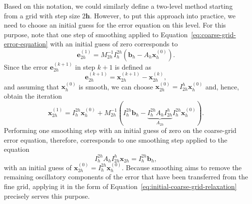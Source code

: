 Based on this notation, we could similarly define a two-level method starting from a grid with step size $2\bm{h}$.
However, to put this approach into practice, we need to choose an initial guess for the error equation on this level.
For this purpose, note that one step of smoothing applied to Equation~\eqref{eq:coarse-grid-error-equation} with an initial guess of zero corresponds to
\begin{equation}
	\bm{e}_{2h}^{(1)} = M_{2h}^{-1} I_{h}^{2h} \left(\bm{b}_h - A_h \bm{x}^{(0)}_h\right).
	\label{eq:initial-coarse-grid-relaxation}
\end{equation}
Since the error $\bm{e}_{2h}^{(k+1)}$ in step $k+1$ is defined as
\begin{equation*}
	\bm{e}_{2h}^{(k+1)} = \bm{x}_{2h}^{(k+1)} - \bm{x}_{2h}^{(k)},
\end{equation*}
and assuming that $\bm{x}_{h}^{(0)}$ is smooth, we can choose $\bm{x}_{2h}^{(0)} = I_{2h}^{h} \bm{x}_{h}^{(0)}$ and, hence, obtain the iteration
\begin{equation}
	\bm{x}_{2h}^{(1)} = I_{h}^{2h} \bm{x}_{h}^{(0)} + M_{2h}^{-1} ( I_{h}^{2h} \bm{b}_h - \underbrace{I_{h}^{2h} A_h I_{2h}^{h}}_{A_{2h}} I_{h}^{2h} \bm{x}_{h}^{(0)} ).
\end{equation}
Performing one smoothing step with an initial guess of zero on the coarse-grid error equation, therefore, corresponds to one smoothing step applied to the equation
\begin{equation}
	I_{h}^{2h} A_h I_{2h}^h \bm{x}_{2h} = I_{h}^{2h} \bm{b}_h,
\end{equation}
with an initial guess of $\bm{x}_{2h}^{(0)} = I_{h}^{2h} \bm{x}_{h}^{(0)}$.
Because smoothing aims to remove the remaining oscillatory components of the error that have been transferred from the fine grid, applying it in the form of Equation~\eqref{eq:initial-coarse-grid-relaxation} precisely serves this purpose.

